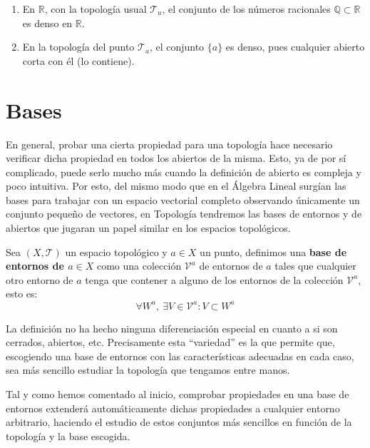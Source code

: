 \begin{ej}
\begin{enumerate}
    \item En $\mathbb{R}$, con la topología usual $\mathcal{T}_u$, el conjunto de los números racionales $\mathbb{Q} \subset \mathbb{R}$ es denso en $\mathbb{R}$.
    \item En la topología del punto $\mathcal{T}_a$, el conjunto $\{a\}$ es denso, pues cualquier abierto corta con él (lo contiene).
\end{enumerate}
\end{ej}

\section{Bases}%
\label{sec:bases}
En general, probar una cierta propiedad para una topología hace necesario verificar dicha propiedad en todos los abiertos de la misma. Esto, ya de por sí complicado, puede serlo mucho más cuando la definición de abierto es compleja y poco intuitiva. Por esto, del mismo modo que en el Álgebra Lineal surgían las bases para trabajar con un espacio vectorial completo observando únicamente un conjunto pequeño de vectores, en Topología tendremos las bases de entornos y de abiertos que jugaran un papel similar en los espacios topológicos.

\begin{defi}
Sea $(X, \mathcal{T})$ un espacio topológico y $a\in X$ un punto, definimos una \textbf{base de entornos de $a \in X$} como una colección $\mathcal{V}^a$ de entornos de $a$ tales que cualquier otro entorno de $a$ tenga que contener a alguno de los entornos de la colección $\mathcal{V}^a$, esto es:
\[
\forall W^a, \ \exists V \in \mathcal{V}^a : V \subset W^a
\]
\end{defi}

\begin{obs}
La definición no ha hecho ninguna diferenciación especial en cuanto a si son cerrados, abiertos, etc. Precisamente esta ``variedad'' es la que permite que, escogiendo una base de entornos con las características adecuadas en cada caso, sea más sencillo estudiar la topología que tengamos entre manos.

Tal y como hemos comentado al inicio, comprobar propiedades en una base de entornos extenderá automáticamente dichas propiedades a cualquier entorno arbitrario, haciendo el estudio de estos conjuntos más sencillos en función de la topología y la base escogida.
\end{obs}

